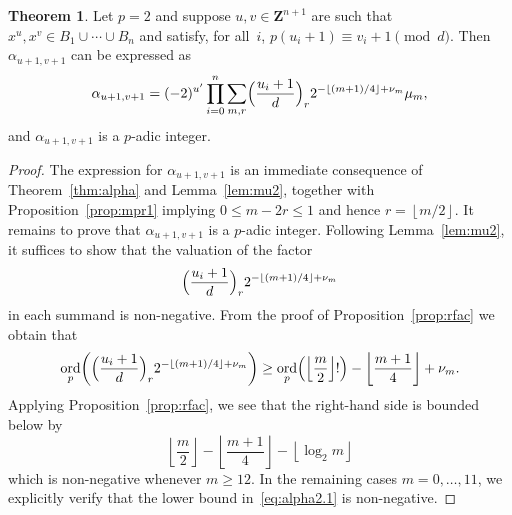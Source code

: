 \documentclass[a4paper,11pt]{article}
\numberwithin{equation}{section}
\providecommand{\floor}[1]{\left\lfloor#1\right\rfloor}   %
\newcommand{\ZZ}{\mathbf{Z}} %
\DeclareMathOperator{\ord}{ord}          %
\theoremstyle{definition}
\newtheorem{thm}{Theorem}[section]
\begin{document}
\begin{thm} \label{thm:alpha2}
Let $p = 2$ and suppose $u, v \in \ZZ^{n+1}$ are such that 
$x^u, x^v \in B_1 \cup \dotsb \cup B_n$ and satisfy, for all~$i$, 
$p (u_i + 1) \equiv v_i + 1 \pmod{d}$.  Then $\alpha_{u+1,v+1}$ 
can be expressed as 
\begin{equation} \label{eq:alpha2.0}
\alpha_{u+1,v+1} = (-2)^{u'} \prod_{i=0}^n \sum_{m,r} 
    \Bigl(\frac{u_i+1}{d}\Bigr)_r 2^{-\floor{(m+1)/4}+\nu_m} \mu_m, 
\end{equation}
and $\alpha_{u+1,v+1}$ is a $p$-adic integer.
\end{thm}

\begin{proof}
The expression for $\alpha_{u+1,v+1}$ is an immediate consequence 
of Theorem~\ref{thm:alpha} and Lemma~\ref{lem:mu2}, together with 
Proposition~\ref{prop:mpr1} implying $0 \leq m - 2r \leq 1$ and 
hence $r = \floor{m/2}$.  It remains to prove that 
$\alpha_{u+1,v+1}$ is a $p$-adic integer.  Following Lemma~\ref{lem:mu2}, 
it suffices to show that the valuation of the factor 
\begin{equation*}
\Bigl(\frac{u_i+1}{d}\Bigr)_r 2^{- \floor{(m+1)/4} + \nu_m}
\end{equation*}
in each summand is non-negative.  From the proof of 
Proposition~\ref{prop:rfac} we obtain that 
\begin{equation} \label{eq:alpha2.1}
\ord_p \biggl( \Bigl(\frac{u_i+1}{d}\Bigr)_r 2^{- \floor{(m+1)/4} + \nu_m} \biggr)
\geq \ord_p\Bigl(\floor{\frac{m}{2}}!\Bigr) - \floor{\frac{m+1}{4}} + \nu_m.
\end{equation}
Applying Proposition~\ref{prop:rfac}, we see that the right-hand side 
is bounded below by 
\begin{equation}
\floor{\frac{m}{2}} - \floor{\frac{m+1}{4}} - \floor{\log_2 m}
\end{equation}
which is non-negative whenever $m \geq 12$.  In the remaining 
cases $m = 0, \dotsc, 11$, we explicitly verify that the 
lower bound in~\eqref{eq:alpha2.1} is non-negative.
\end{proof}
\end{document}
